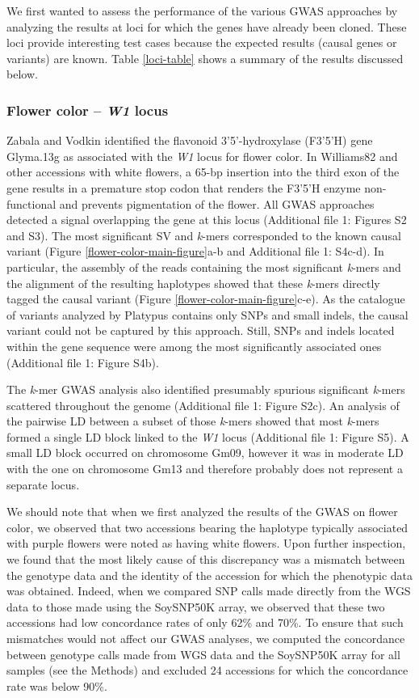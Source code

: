 \documentclass{article}
\begin{document}
We first wanted to assess the performance of the various GWAS
approaches by analyzing the results at loci for which the genes have
already been cloned. These loci provide interesting test cases because
the expected results (causal genes or variants) are known. Table \ref{loci-table} shows
a summary of the results discussed below.

\subsubsection*{Flower color -- \textit{W1} locus}

Zabala and Vodkin \cite{zabala2007} identified the flavonoid 3’5’-hydroxylase (F3’5’H) gene
Glyma.13g as associated with the \textit{W1} locus for flower color. In
Williams82 and other accessions with white flowers, a 65-bp insertion into the
third exon of the gene results in a premature stop codon that renders the
F3’5’H enzyme non-functional and prevents pigmentation of the flower. All
GWAS approaches detected a signal overlapping the gene at this locus (Additional file 1: Figures
S2 and S3). The most
significant SV and \textit{k}-mers corresponded to the known causal variant
(Figure \ref{flower-color-main-figure}a-b and Additional file 1: S4c-d).
In particular, the assembly of the reads containing the most significant \textit{k}-mers
and the alignment of the resulting haplotypes showed that these \textit{k}-mers
directly tagged the causal variant (Figure \ref{flower-color-main-figure}c-e).
As the catalogue of variants analyzed by Platypus contains only SNPs and small
indels, the causal variant could not be captured by this approach. Still, SNPs
and indels located within the gene sequence were among the most significantly
associated ones (Additional file 1: Figure S4b).

The \textit{k}-mer GWAS analysis also identified presumably spurious significant
\textit{k}-mers scattered throughout the genome (Additional file 1: Figure
S2c). An analysis of the pairwise LD between a subset
of those \textit{k}-mers showed that most \textit{k}-mers formed a single LD block
linked to the \textit{W1} locus (Additional file 1: Figure S5). A small LD block
occurred on chromosome Gm09, however it was in moderate LD with the one on chromosome
Gm13 and therefore probably does not represent a separate locus.

We should note that when we first analyzed the results of the GWAS on flower
color, we observed that two accessions bearing the haplotype typically
associated with purple flowers were noted as having white flowers. Upon further
inspection, we found that the most likely cause of this discrepancy was a
mismatch between the genotype data and the identity of the accession for which
the phenotypic data was obtained. Indeed, when we compared SNP calls made
directly from the WGS data to those made using the SoySNP50K array, we observed
that these two accessions had low concordance rates of only 62\% and 70\%. To
ensure that such mismatches would not affect our GWAS analyses, we computed the
concordance between genotype calls made from WGS data and the SoySNP50K array
for all samples (see the Methods) and excluded 24 accessions for which the
concordance rate was below 90\%.
\end{document}
